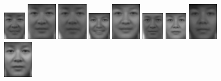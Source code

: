 \begin{figure}[hbt]
  \centering
  \includegraphics[width=0.1\textwidth]{../results/H_rez/correct80/1/testImg.jpg} \vline
  \hspace{2pt}
  \includegraphics[width=42pt]{../results/H_rez/correct80/1/1.jpg}
  \includegraphics[width=42pt]{../results/H_rez/correct80/1/2.jpg}
  \includegraphics[width=31pt]{../results/H_rez/correct80/1/3.jpg}
  \includegraphics[width=42pt]{../results/H_rez/correct80/1/4.jpg}
  \includegraphics[width=31pt]{../results/H_rez/correct80/1/5.jpg}
  \includegraphics[width=31pt]{../results/H_rez/correct80/1/6.jpg}
  \includegraphics[width=42pt]{../results/H_rez/correct80/1/7.jpg}
  \includegraphics[width=42pt]{../results/H_rez/correct80/1/8.jpg}

\end{figure}
